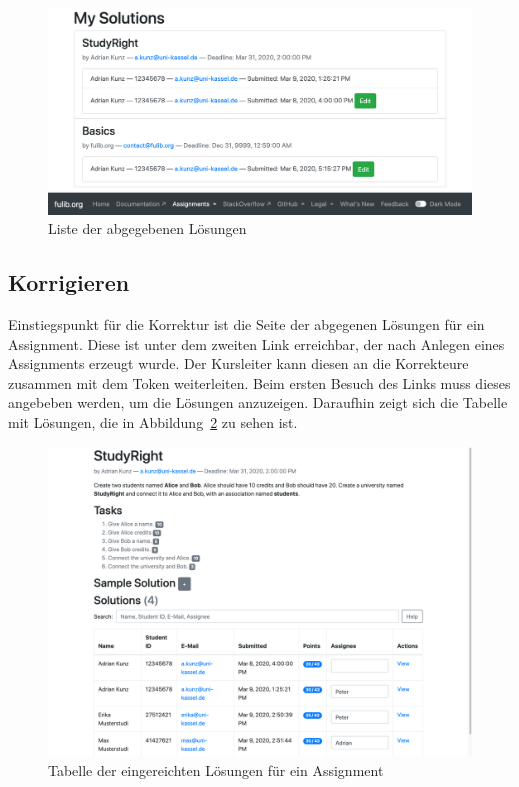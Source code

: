 \begin{figure}
    \centering
    \includegraphics[width=\textwidth]{chapter/fulib.org/img/my-solutions.png}
    \caption{Liste der abgegebenen Lösungen}
    \label{fig:my-solutions}
\end{figure}

\subsection{Korrigieren}\label{subsec:correcting}

Einstiegspunkt für die Korrektur ist die Seite der abgegenen Lösungen für ein Assignment.
Diese ist unter dem zweiten Link erreichbar, der nach Anlegen eines Assignments erzeugt wurde.
Der Kursleiter kann diesen an die Korrekteure zusammen mit dem Token weiterleiten.
Beim ersten Besuch des Links muss dieses angebeben werden, um die Lösungen anzuzeigen.
Daraufhin zeigt sich die Tabelle mit Lösungen, die in Abbildung~\ref{fig:solution-table} zu sehen ist.

\begin{figure}
    \centering
    \includegraphics[width=\textwidth]{chapter/fulib.org/img/solution-table.png}
    \caption{Tabelle der eingereichten Lösungen für ein Assignment}
    \label{fig:solution-table}
\end{figure}

